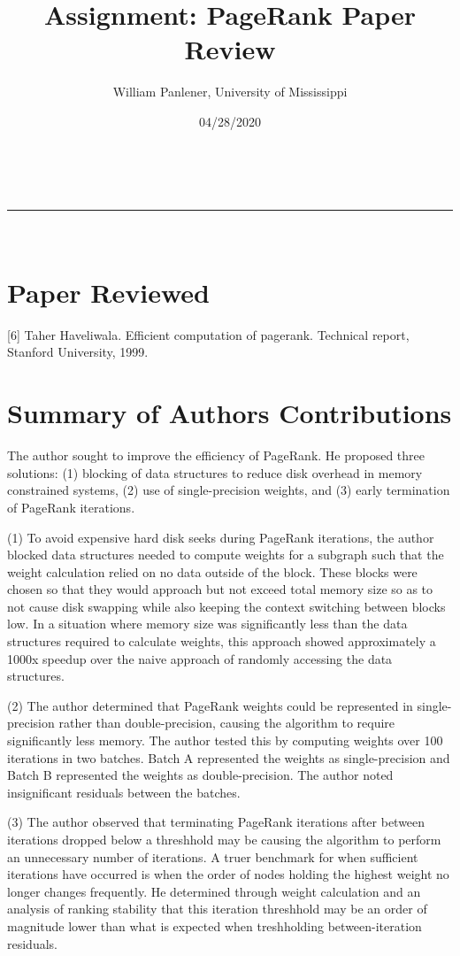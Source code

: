 \documentclass[a4paper,11pt]{article}
\makeatletter
\newcommand{\linia}{\rule{\linewidth}{0.5pt}}
\theoremstyle{mytheor}
\renewcommand{\maketitle}{
\begin{center}
\vspace{2ex}
{\huge \textsc{\@title}}
\vspace{1ex}
\\
\linia\\
\@author \hfill \@date
\vspace{4ex}
\end{center}
}
\makeatother
\begin{document}
\title{Assignment: PageRank Paper Review}

\author{William Panlener, University of Mississippi}

\date{04/28/2020}

\maketitle

\section*{Paper Reviewed}

[6] Taher Haveliwala. Efficient computation of pagerank.  Technical report, Stanford University, 1999.

\section*{Summary of Authors Contributions}

The author sought to improve the efficiency of PageRank. He proposed three solutions: (1) blocking of data structures to reduce disk overhead in memory constrained systems, (2) use of single-precision weights, and (3) early termination of PageRank iterations.

(1) To avoid expensive hard disk seeks during PageRank iterations, the author blocked data structures needed to compute weights for a subgraph such that the weight calculation relied on no data outside of the block. These blocks were chosen so that they would approach but not exceed total memory size so as to not cause disk swapping while also keeping the context switching between blocks low. In a situation where memory size was significantly less than the data structures required to calculate weights, this approach showed approximately a 1000x speedup over the naive approach of randomly accessing the data structures.

(2) The author determined that PageRank weights could be represented in single-precision rather than double-precision, causing the algorithm to require significantly less memory. The author tested this by computing weights over 100 iterations in two batches. Batch A represented the weights as single-precision and Batch B represented the weights as double-precision. The author noted insignificant residuals between the batches.

(3) The author observed that terminating PageRank iterations after between iterations dropped below a threshhold may be causing the algorithm to perform an unnecessary number of iterations. A truer benchmark for when sufficient iterations have occurred is when the order of nodes holding the highest weight no longer changes frequently. He determined through weight calculation and an analysis of ranking stability that this iteration threshhold may be an order of magnitude lower than what is expected when treshholding between-iteration residuals.
\end{document}
